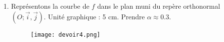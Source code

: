 \documentclass[12pt,a4paper]{article}
\begin{document}
\begin{enumerate}
\item Représentons la courbe de $f$ dans le plan muni du repère orthonormal $(O ; \vec{i}, \vec{j})$. Unité graphique : 5 cm. Prendre $\alpha \approx 0.3$.

\begin{figure}[h!]
    \centering
    \texttt{[image: devoir4.png]} %
    \label{fig:courbe_f}
\end{figure}

\end{enumerate}
\end{document}
